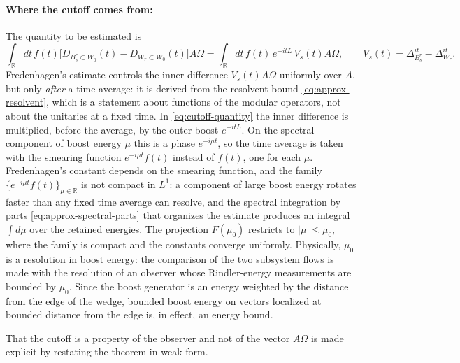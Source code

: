 \documentclass[a4paper,11pt]{article}
\theoremstyle{definition}
\begin{document}
\paragraph{Where the cutoff comes from:}
The quantity to be estimated is
\begin{equation}
 \int_{\mathbb R}dt\,f(t)\bigl[D_{B_s^r\subset W_0}(t)-D_{W_r\subset W_0}(t)\bigr]A\Omega
 =\int_{\mathbb R}dt\,f(t)\,e^{-itL}\,V_s(t)A\Omega,\qquad V_s(t)=\Delta_{B_s^r}^{it}-\Delta_{W_r}^{it}.
 \label{eq:cutoff-quantity}
\end{equation}
Fredenhagen's estimate controls the inner difference $V_s(t)A\Omega$ uniformly over $A$, but only \emph{after} a time average: it is derived from the resolvent bound \eqref{eq:approx-resolvent}, which is a statement about functions of the modular operators, not about the unitaries at a fixed time. In \eqref{eq:cutoff-quantity} the inner difference is multiplied, before the average, by the outer boost $e^{-itL}$. On the spectral component of boost energy $\mu$ this is a phase $e^{-i\mu t}$, so the time average is taken with the smearing function $e^{-i\mu t}f(t)$ instead of $f(t)$, one for each $\mu$. Fredenhagen's constant depends on the smearing function, and the family $\{e^{-i\mu t}f(t)\}_{\mu\in\mathbb R}$ is not compact in $L^1$: a component of large boost energy rotates faster than any fixed time average can resolve, and the spectral integration by parts \eqref{eq:approx-spectral-parts} that organizes the estimate produces an integral $\int d\mu$ over the retained energies. The projection $F(\mu_0)$ restricts to $|\mu|\le\mu_0$, where the family is compact and the constants converge uniformly. Physically, $\mu_0$ is a resolution in boost energy: the comparison of the two subsystem flows is made with the resolution of an observer whose Rindler-energy measurements are bounded by $\mu_0$. Since the boost generator is an energy weighted by the distance from the edge of the wedge, bounded boost energy on vectors localized at bounded distance from the edge is, in effect, an energy bound. 

That the cutoff is a property of the observer and not of the vector $A\Omega$ is made explicit by restating the theorem in weak form.
\end{document}
